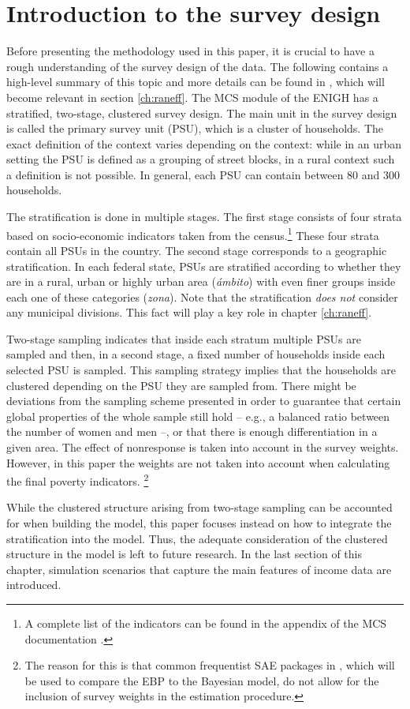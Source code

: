\section{Introduction to the survey design}
\label{ch:design}

Before presenting the methodology used in this paper, it is crucial to have a rough understanding of the survey design of the data.
The following contains a high-level summary of this topic and more details can be found in \cite{inegi_modulo_2011}, which will become relevant in section \ref{ch:raneff}.
The MCS module of the ENIGH has a stratified, two-stage, clustered survey design.
The main unit in the survey design is called the primary survey unit (PSU), which is a cluster of households.
The exact definition of the context varies depending on the context:
while in an urban setting the PSU is defined as a grouping of street blocks, in a rural context such a definition is not possible.
In general, each PSU can contain between 80 and 300 households.

The stratification is done in multiple stages.
The first stage consists of four strata based on socio-economic indicators taken from the census.\footnote{A complete list of the indicators can be found in the appendix of the MCS documentation \citep{inegi_modulo_2011}.} These four strata contain all PSUs in the country.
The second stage corresponds to a geographic stratification.
In each federal state, PSUs are stratified according to whether they are in a rural, urban or highly urban area (\textit{ámbito}) with even finer groups inside each one of these categories (\textit{zona}).
Note that the stratification \textit{does not} consider any municipal divisions.
This fact will play a key role in chapter \ref{ch:raneff}.

Two-stage sampling indicates that inside each stratum multiple PSUs are sampled and then, in a second stage, a fixed number of households inside each selected PSU is sampled.
This sampling strategy implies that the households are clustered depending on the PSU they are sampled from.
There might be deviations from the sampling scheme presented in order to guarantee that certain global properties of the whole sample still hold – e.g., a balanced ratio between the number of women and men –, or that there is enough differentiation in a given area.
The effect of nonresponse is taken into account in the survey weights.
However, in this paper the weights are not taken into account when calculating the final poverty indicators.
\footnote{The reason for this is that common frequentist SAE packages in , which will be used to compare the EBP to the Bayesian model, do not allow for the inclusion of survey weights in the estimation procedure.}

While the clustered structure arising from two-stage sampling can be accounted for when building the model, this paper focuses instead on how to integrate the stratification into the model.
Thus, the adequate consideration of the clustered structure in the model is left to future research.
In the last section of this chapter, simulation scenarios that capture the main features of income data are introduced.



